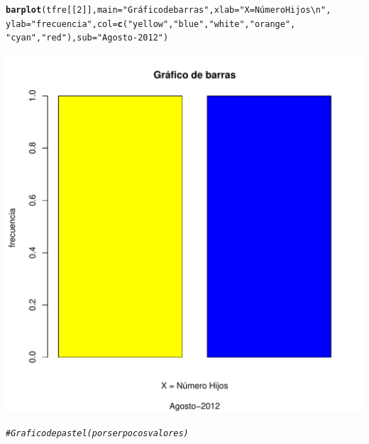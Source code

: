 \documentclass[12pt,letterpaper]{article}\usepackage[]{graphicx}\usepackage[]{color}
\makeatletter
\def\maxwidth{ %
  \ifdim\Gin@nat@width>\linewidth
    \linewidth
  \else
    \Gin@nat@width
  \fi
}
\newcommand{\hlnum}[1]{\textcolor[rgb]{0.686,0.059,0.569}{#1}}%
\newcommand{\hlstr}[1]{\textcolor[rgb]{0.192,0.494,0.8}{#1}}%
\newcommand{\hlcom}[1]{\textcolor[rgb]{0.678,0.584,0.686}{\textit{#1}}}%
\newcommand{\hlstd}[1]{\textcolor[rgb]{0.345,0.345,0.345}{#1}}%
\newcommand{\hlkwc}[1]{\textcolor[rgb]{0.333,0.667,0.333}{#1}}%
\newcommand{\hlkwd}[1]{\textcolor[rgb]{0.737,0.353,0.396}{\textbf{#1}}}%
\newenvironment{kframe}{%
 \def\at@end@of@kframe{}%
 \ifinner\ifhmode%
  \def\at@end@of@kframe{\end{minipage}}%
  \begin{minipage}{\columnwidth}%
 \fi\fi%
 \def\FrameCommand##1{\hskip\@totalleftmargin \hskip-\fboxsep
 \colorbox{shadecolor}{##1}\hskip-\fboxsep
     \hskip-\linewidth \hskip-\@totalleftmargin \hskip\columnwidth}%
 \MakeFramed {\advance\hsize-\width
   \@totalleftmargin\z@ \linewidth\hsize
   \@setminipage}}%
 {\par\unskip\endMakeFramed%
 \at@end@of@kframe}
\newenvironment{knitrout}{}{} %
\makeatother
\begin{document}
\begin{enumerate}
\begin{knitrout}
\begin{kframe}
\begin{alltt}
\hlkwd{barplot}\hlstd{(tfre[[}\hlnum{2}\hlstd{]],} \hlkwc{main}\hlstd{=}\hlstr{"Gráfico de barras"}\hlstd{,} \hlkwc{xlab}\hlstd{=}\hlstr{"X = Número Hijos\textbackslash{}n"}\hlstd{,}
        \hlkwc{ylab}\hlstd{=}\hlstr{"frecuencia"}\hlstd{,} \hlkwc{col}\hlstd{=}\hlkwd{c}\hlstd{(}\hlstr{"yellow"}\hlstd{,} \hlstr{"blue"}\hlstd{,} \hlstr{"white"}\hlstd{,} \hlstr{"orange"}\hlstd{,}
                                 \hlstr{"cyan"}\hlstd{,} \hlstr{"red"}\hlstd{),} \hlkwc{sub}\hlstd{=}\hlstr{"Agosto-2012"}\hlstd{)}
\end{alltt}
\end{kframe}
\includegraphics[width=\maxwidth]{figure/unnamed-chunk-24-1} 

\end{knitrout}

\begin{knitrout}
\color{fgcolor}\begin{kframe}
\begin{alltt}
\hlcom{# Grafico de pastel (por ser pocos valores)}


\end{alltt}
\end{kframe}
\end{knitrout}
\end{enumerate}
\end{document}
